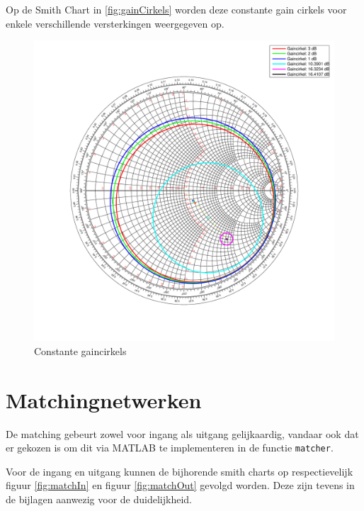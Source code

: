   Op de Smith Chart \cite{smithchart} in \autoref{fig:gainCirkels} worden deze
  constante gain cirkels voor enkele verschillende
  versterkingen weergegeven op.
  \begin{figure}[!h]
      \centering
      \includegraphics[width=\textwidth,keepaspectratio=true]{fig/gaincirkels.pdf}  
      \caption{Constante gaincirkels} 
      \label{fig:gainCirkels}
    \end{figure}
  

\section{Matchingnetwerken}
  De matching gebeurt zowel voor ingang als uitgang gelijkaardig, vandaar ook
  dat er gekozen is om dit via MATLAB te implementeren in de functie \texttt{matcher}.


  Voor de ingang en uitgang kunnen de bijhorende smith charts op respectievelijk
  figuur \ref{fig:matchIn} en figuur \ref{fig:matchOut} gevolgd worden. Deze zijn
  tevens in de bijlagen aanwezig voor de duidelijkheid.

